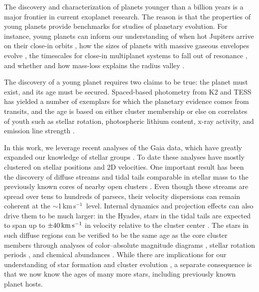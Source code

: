 \documentclass[12pt,twocolumn,tighten,linenumbers,trackchanges]{aastex63}
\newcommand{\kms}{\,km\,s$^{-1}$}
\newcommand{\mkms}{{\rm \,km\,s^{-1}}}  %
\begin{document}
The discovery and characterization of planets younger than a billion
years is a major frontier in current exoplanet research.  The reason
is that the properties of young planets provide benchmarks for studies
of planetary evolution.  For instance, young planets can inform our
understanding of when hot Jupiters arrive on their close-in orbits
\citep{dawson_johnson_2018}, how the sizes of planets with massive
gaseous envelopes evolve \citep{rizzuto_tess_2020}, the timescales for
close-in multiplanet systems to fall out of resonance
\citep{izidoro_breaking_2017,arevalo_stability_2022,goldberg_architectures_2022}, and
whether and how mass-loss explains the radius valley
\citep{lopez_how_2012,Owen_Wu_2013,Fulton_et_al_2017,ginzburg_corepowered_2018,lee_primordial_2021}.

The discovery of a young planet requires two claims to be true: the
planet must exist, and its age must be secured.  Spaced-based
photometry from K2 and TESS has yielded a number of exemplars for
which the planetary evidence comes from transits, and the age is based
on either cluster membership
\citep{Mann_et_al_2017,david_four_2019,newton_tess_2019,bouma_cluster_2020,nardiello_pathosII_2020}
or else on correlates of youth such as stellar rotation, photospheric
lithium content, x-ray activity, and emission line strength
\citep{zhou_2021_tois,hedges_toi-2076_2021}.

In this work, we leverage recent analyses of the Gaia data, which have
greatly expanded our knowledge of stellar groups
\citep[{e.g.},][]{CantatGaudin2018a,KounkelCovey2019,Kerr2021}.  To
date these analyses have mostly clustered on stellar positions and 2D
velocities.  One important result has been the discovery of diffuse
streams and tidal tails comparable in stellar mass to the previously
known cores of nearby open clusters
\citep{meingast_psceri_2019,Meingast2021,gagne_number_2021}.  Even
though these streams are spread over tens to hundreds of parsecs,
their velocity dispersions can remain coherent at the $\sim$1\kms\
level.  Internal dynamics and projection effects can also drive them
to be much larger: in the Hyades, stars in the tidal tails are
expected to span up to $\pm 40\mkms$ in velocity relative to the
cluster center \citep{jerabkova_800_2021}.  The stars in such diffuse
regions can be verified to be the same age as the core cluster members
through analyses of color--absolute magnitude diagrams
\citep{KounkelCovey2019}, stellar rotation periods
\citep{curtis_tess_2019,bouma_2021_ngc2516}, and chemical abundances
\citep{hawkins_2020}.  While there are implications for our
understanding of star formation and cluster evolution
\citep{dinnbier_tidal_2020}, a separate consequence is that we now
know the ages of many more stars, including previously known planet
hosts.
\end{document}
